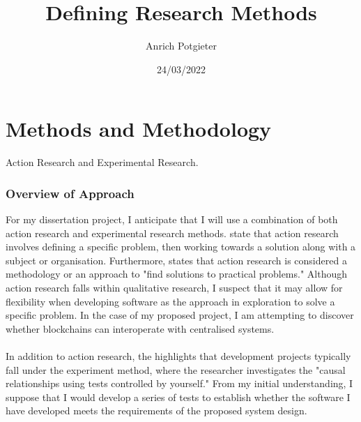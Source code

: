 \documentclass[12pt]{article}
\title{Defining Research Methods}
\author{Anrich Potgieter}
\date{24/03/2022}
\begin{document}
\maketitle
\tableofcontents

\section{ Methods and Methodology}

Action Research and Experimental Research.

\subsubsection{Overview of Approach}

For my dissertation project, I anticipate that I will use a combination of both action research and experimental research methods.
\autocite{dawsonChapterResearchMethods2015} state that action research involves defining a specific problem, then working towards a solution along with a subject or organisation.
Furthermore, \autocite{blairChapterChoosingMethodology2016} states that action research is considered a methodology or an approach to "find solutions to practical problems." 
Although action research falls within qualitative research, I suspect that it may allow for flexibility when developing software as the approach in exploration to solve a specific problem. In the case of my proposed project, I am attempting to discover whether blockchains can interoperate with centralised systems.
\\\\
In addition to action research, the \autocite{dawsonChapterResearchMethods2015} highlights that development projects typically fall under the experiment method, where the researcher investigates the "causal relationships using tests controlled by yourself."
From my initial understanding, I suppose that I would develop a series of tests to establish whether the software I have developed meets the requirements of the proposed system design.

\printbibliography
\end{document}
